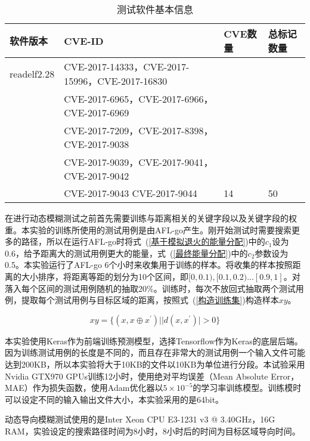 \begin{table}[ht]
\begin{center}
\caption{测试软件基本信息}
\label{测试软件基本信息}
\begin{small}
\begin{tabular}{|l|l|l|l|}
\hline
{\bf 软件版本} & {\bf CVE-ID} & {\bf CVE数量} & {\bf 总标记数量} \\
\hline
readelf2.28 & CVE-2017-14333，CVE-2017-15996，CVE-2017-16830 & &\\
& CVE-2017-6965，CVE-2017-6966，CVE-2017-6969 & & \\
& CVE-2017-7209，CVE-2017-8398，CVE-2017-9038 & & \\
& CVE-2017-9039，CVE-2017-9041，CVE-2017-9042 & & \\
& CVE-2017-9043 CVE-2017-9044 & 14 & 50\\
\hline
\end{tabular}
\end{small}
\end{center}
\end{table}


在进行动态模糊测试之前首先需要训练与距离相关的关键字段以及关键字段的权重。本实验的训练所使用的测试用例是由AFL-go产生。刚开始测试时需要搜索更多的路径，所以在运行AFL-go时将式~(\ref{基于模拟退火的能量分配})中的$c_1$设为0.6，给予距离大的测试用例更大的能量，式~(\ref{最终能量分配})中的$c_2$参数设为0.5。本实验运行了AFL-go 6个小时来收集用于训练的样本。将收集的样本按照距离的大小排序，将距离等距的划分为10个区间，即$[0,0.1),[0.1,0.2)...[0.9,1]$。对落入每个区间的测试用例随机的抽取20\%。训练时，每次不放回式抽取两个测试用例，提取每个测试用例与目标区域的距离，按照式~(\ref{构造训练集})构造样本$xy$。

\begin{equation}\label{构造训练集}
xy = \{(x,x \oplus x^{'}) | |d(x,x^{'})| > 0\}
\end{equation}

本实验使用Keras作为前端训练预测模型，选择Tensorflow作为Keras的底层后端。因为训练测试用例的长度是不同的，而且存在非常大的测试用例一个输入文件可能达到200KB，所以本实验将大于10KB的文件以10KB为单位进行分段。本试验采用Nvidia GTX970 GPUs训练12小时，使用绝对平均误差（Mean Absolute Error，MAE）作为损失函数，使用Adam优化器以$5 \times 10^{-5}$的学习率训练模型。训练模时可以设定不同的输入输出文件大小，本实验采用的是64bit。

动态导向模糊测试使用的是Inter Xeon CPU E3-1231 v3 @ 3.40GHz，16G RAM，实验设定的搜索路径时间为8小时，8小时后的时间为目标区域导向时间。

